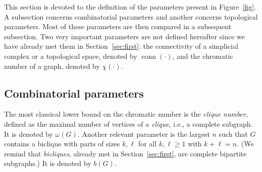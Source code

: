 \documentclass[12pt]{amsart}
\theoremstyle{definition}
\renewcommand{\geq}{\geqslant}
\renewcommand{\leq}{\leqslant}
\def\conn{\operatorname{conn}}
\begin{document}


This section is devoted to the definition of the parameters present in Figure~\ref{fig}. A subsection concerns combinatorial parameters and another concerns topological parameters. Most of these parameters are then compared in a subsequent subsection. Two very important parameters are not defined hereafter since we have already met them in Section~\ref{sec:first}: the connectivity of a simplicial complex or a topological space, denoted by $\conn(\cdot)$, and the chromatic number of a graph, denoted by $\chi(\cdot)$. 





\subsection{Combinatorial parameters}\label{subsec:comb}

The most classical lower bound on the chromatic number is the {\em clique number}, defined as the maximal number of vertices of a {\em clique}, i.e., a complete subgraph. It is denoted by $\omega(G)$. Another relevant parameter is the largest $n$ such that $G$ contains a biclique with parts of sizes $k,\ell$ for all $k,\ell \geq 1$ with $k+\ell = n$. (We remind that {\em bicliques}, already met in Section~\ref{sec:first}, are complete bipartite subgraphs.) It is denoted by $b(G)$.
\end{document}

